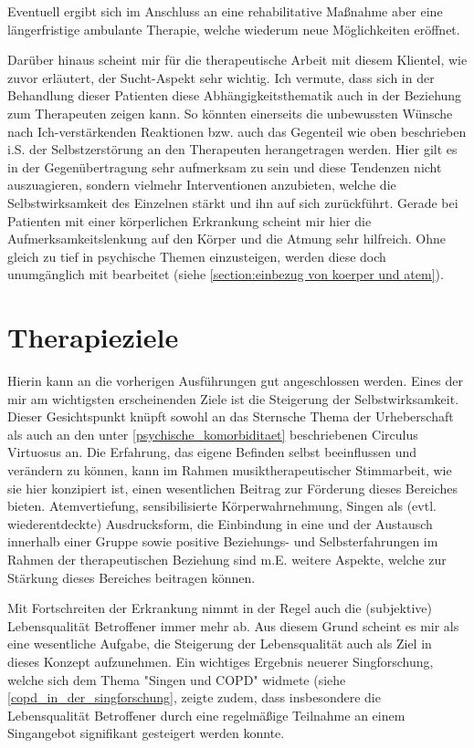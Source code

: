 Eventuell ergibt sich im Anschluss an eine rehabilitative Maßnahme aber eine längerfristige ambulante Therapie, welche wiederum neue Möglichkeiten eröffnet. 

Darüber hinaus scheint mir für die therapeutische Arbeit mit diesem Klientel, wie zuvor erläutert, der Sucht-Aspekt sehr wichtig. Ich vermute, dass sich in der Behandlung dieser Patienten diese Abhängigkeitsthematik auch in der Beziehung zum Therapeuten zeigen kann. So könnten einerseits die unbewussten Wünsche nach Ich-verstärkenden Reaktionen bzw. auch das Gegenteil wie oben beschrieben i.S. der Selbstzerstörung an den Therapeuten herangetragen werden. Hier gilt es in der Gegenübertragung sehr aufmerksam zu sein und diese Tendenzen nicht auszuagieren, sondern vielmehr Interventionen anzubieten, welche die Selbstwirksamkeit des Einzelnen stärkt und ihn auf sich zurückführt. Gerade bei Patienten mit einer körperlichen Erkrankung scheint mir hier die Aufmerksamkeitslenkung auf den Körper und die Atmung sehr hilfreich. Ohne gleich zu tief in psychische Themen einzusteigen, werden diese doch unumgänglich mit bearbeitet (siehe \ref{section:einbezug von koerper und atem}). 

\section{Therapieziele}
Hierin kann an die vorherigen Ausführungen gut angeschlossen werden. Eines der mir am wichtigsten erscheinenden Ziele ist die Steigerung der Selbstwirksamkeit. Dieser Gesichtspunkt knüpft sowohl an das Sternsche Thema der Urheberschaft als auch an den unter \ref{psychische_komorbiditaet} beschriebenen Circulus Virtuosus an. Die Erfahrung, das eigene Befinden selbst beeinflussen und verändern zu können, kann im Rahmen musiktherapeutischer Stimmarbeit, wie sie hier konzipiert ist, einen wesentlichen Beitrag zur Förderung dieses Bereiches bieten. Atemvertiefung, sensibilisierte Körperwahrnehmung, Singen als (evtl. wiederentdeckte) Ausdrucksform, die Einbindung in eine und der Austausch innerhalb einer Gruppe sowie positive Beziehungs- und Selbsterfahrungen im Rahmen der therapeutischen Beziehung sind m.E. weitere Aspekte, welche zur Stärkung dieses Bereiches beitragen können.

Mit Fortschreiten der Erkrankung nimmt in der Regel auch die (subjektive) Lebensqualität Betroffener immer mehr ab. Aus diesem Grund scheint es mir als eine wesentliche Aufgabe, die Steigerung der Lebensqualität auch als Ziel in dieses Konzept aufzunehmen. Ein wichtiges Ergebnis neuerer Singforschung, welche sich dem Thema "Singen und COPD" widmete (siehe \ref{copd_in_der_singforschung}, zeigte zudem, dass insbesondere die Lebensqualität Betroffener durch eine regelmäßige Teilnahme an einem Singangebot signifikant gesteigert werden konnte. 

